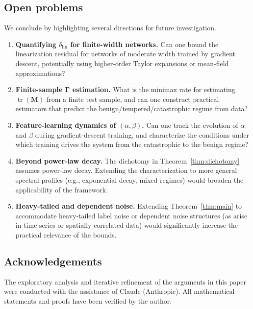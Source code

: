 \documentclass[12pt]{amsart}
\theoremstyle{definition}
\theoremstyle{remark}
\DeclareMathOperator{\tr}{tr}
\newcommand{\bM}{\mathbf{M}}
\begin{document}
\subsection{Open problems}

We conclude by highlighting several directions for future investigation.

\begin{enumerate}
  \item \textbf{Quantifying $\delta_{\mathrm{lin}}$ for finite-width networks.}
    Can one bound the linearization residual for networks of moderate width
    trained by gradient descent, potentially using higher-order Taylor expansions
    or mean-field approximations?

  \item \textbf{Finite-sample $\boldsymbol{\Gamma}$ estimation.}
    What is the minimax rate for estimating $\tr(\bM)$ from a finite test sample,
    and can one construct practical estimators that predict the
    benign/tempered/catastrophic regime from data?

  \item \textbf{Feature-learning dynamics of $(\alpha, \beta)$.}
    Can one track the evolution of $\alpha$ and $\beta$ during gradient-descent
    training, and characterize the conditions under which training drives the
    system from the catastrophic to the benign regime?

  \item \textbf{Beyond power-law decay.}
    The dichotomy in Theorem~\ref{thm:dichotomy} assumes power-law decay.
    Extending the characterization to more general spectral profiles (e.g.,
    exponential decay, mixed regimes) would broaden the applicability of the
    framework.

  \item \textbf{Heavy-tailed and dependent noise.}
    Extending Theorem~\ref{thm:main} to accommodate heavy-tailed label noise
    or dependent noise structures (as arise in time-series or spatially
    correlated data) would significantly increase the practical relevance of the
    bounds.
\end{enumerate}


\subsection*{Acknowledgements}
The exploratory analysis and iterative refinement of the arguments in this
paper were conducted with the assistance of Claude (Anthropic).  All
mathematical statements and proofs have been verified by the author.
\end{document}
